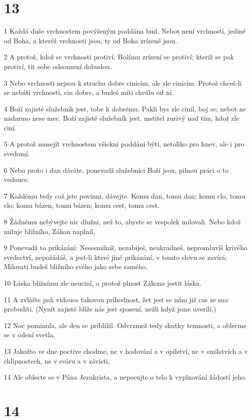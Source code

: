 \chapter{13}

\par 1 Každá duše vrchnostem povýšeným poddána bud. Nebot není vrchnosti, jediné od Boha, a kteréž vrchnosti jsou, ty od Boha zrízené jsou.
\par 2 A protož, kdož se vrchnosti protiví, Božímu zrízení se protiví; kteríž se pak protiví, tit sobe odsouzení dobudou.
\par 3 Nebo vrchnosti nejsou k strachu dobre cinícím, ale zle cinícím. Protož chceš-li se nebáti vrchnosti, cin dobre, a budeš míti chválu od ní.
\par 4 Boží zajisté služebník jest, tobe k dobrému. Pakli bys zle cinil, boj se; nebot ne nadarmo nese mec. Boží zajisté služebník jest, mstitel zurivý nad tím, kdož zle ciní.
\par 5 A protož musejít vrchnostem všickni poddáni býti, netoliko pro hnev, ale i pro svedomí.
\par 6 Nebo proto i dan dáváte, ponevadž služebníci Boží jsou, pilnou práci o to vedouce.
\par 7 Každému tedy což jste povinni, dávejte. Komu dan, tomu dan; komu clo, tomu clo; komu bázen, tomu bázen; komu cest, tomu cest.
\par 8 Žádnému nebývejte nic dlužni, než to, abyste se vespolek milovali. Nebo kdož miluje bližního, Zákon naplnil,
\par 9 Ponevadž to prikázání: Nesesmilníš, nezabiješ, neukradneš, nepromluvíš krivého svedectví, nepožádáš, a jest-li které jiné prikázání, v tomto slovu se zavírá: Milovati budeš bližního svého jako sebe samého.
\par 10 Láska bližnímu zle neuciní, a protož plnost Zákona jestit láska.
\par 11 A zvlášte pak vidouce takovou príhodnost, žet jest se nám již cas ze sna probuditi. (Nynít zajisté blíže nás jest spasení, nežli když jsme uverili.)
\par 12 Noc pominula, ale den se priblížil. Odvrzmež tedy skutky temnosti, a oblecme se v odení svetla.
\par 13 Jakožto ve dne poctive chodme, ne v hodování a v opilství, ne v smilstvích a v chlipnostech, ne v sváru a v závisti,
\par 14 Ale oblecte se v Pána Jezukrista, a nepecujte o telo k vyplnování žádostí jeho.

\chapter{14}

